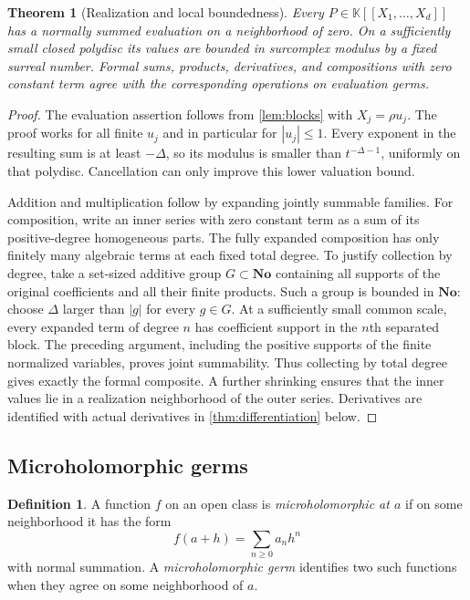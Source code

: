 \documentclass[11pt,letterpaper]{article}
\numberwithin{equation}{section}
\newtheorem{theorem}{Theorem}[section]
\theoremstyle{definition}
\newtheorem{definition}[definition]{Definition}
\theoremstyle{remark}
\newcommand{\No}{\mathbf{No}}
\newcommand{\K}{\mathbb K}
\begin{document}
\begin{theorem}[Realization and local boundedness]\label{thm:realization}
Every $P\in\K[[X_1,\ldots,X_d]]$ has a normally summed evaluation on a
neighborhood of zero. On a sufficiently small closed polydisc its values
are bounded in surcomplex modulus by a fixed surreal number. Formal sums,
products, derivatives, and compositions with zero constant term agree
with the corresponding operations on evaluation germs.
\end{theorem}
\begin{proof}
The evaluation assertion follows from \cref{lem:blocks} with
$X_j=\rho u_j$. The proof works for all finite $u_j$ and in particular
for $|u_j|\le1$. Every exponent in the resulting sum is at least
$-\Delta$, so its modulus is smaller than $t^{-\Delta-1}$, uniformly
on that polydisc. Cancellation can only improve this lower valuation bound.

Addition and multiplication follow by expanding jointly summable families.
For composition, write an inner series with zero constant term as a sum
of its positive-degree homogeneous parts. The fully expanded composition
has only finitely many algebraic terms at each fixed total degree. To
justify collection by degree, take a set-sized additive group $G\subset\No$
containing all supports of the original coefficients and all their finite
products. Such a group is bounded in $\No$: choose $\Delta$ larger than
$|g|$ for every $g\in G$. At a sufficiently small common scale, every
expanded term of degree $n$ has coefficient support in the $n$th separated
block. The preceding argument, including the positive supports of the
finite normalized variables, proves joint summability. Thus collecting
by total degree gives exactly the formal composite. A further shrinking
ensures that the inner values lie in a realization neighborhood of the
outer series. Derivatives are identified with actual derivatives in
\cref{thm:differentiation} below.
\end{proof}

\subsection{Microholomorphic germs}

\begin{definition}\label{def:micro}
A function $f$ on an open class is \emph{microholomorphic at $a$} if on some
neighborhood it has the form
\[
 f(a+h)=\sum_{n\ge0}a_nh^n
\]
with normal summation. A \emph{microholomorphic germ} identifies two such
functions when they agree on some neighborhood of $a$.
\end{definition}
\end{document}
